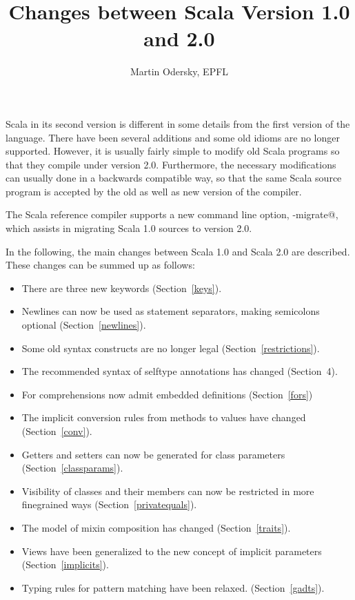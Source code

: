 \documentclass[a4paper,11pt,twoside]{article}
\title{Changes between Scala Version 1.0 and 2.0}
\author{Martin Odersky, EPFL}
\begin{document}
\sloppy
\maketitle

Scala in its second version is different in some details from the
first version of the language. There have been several additions and
some old idioms are no longer supported. However, it is usually fairly
simple to modify old Scala programs so that they compile under version
2.0. Furthermore, the necessary modifications can usually done in a
backwards compatible way, so that the same Scala source program is
accepted by the old as well as new version of the compiler.

The Scala reference compiler supports a new command line option,
\lstinline@-migrate@, which assists in migrating Scala 1.0
sources to version 2.0.

In the following, the main changes between Scala 1.0 and Scala 2.0 are
described. These changes can be summed up as follows:
\begin{itemize}
\item
There are three new keywords (Section~\ref{keys}).
\item
Newlines can now be used as statement separators, making semicolons
optional (Section~\ref{newlines}).
\item 
Some old syntax constructs are no longer legal (Section~\ref{restrictions}).
\item
The recommended syntax of selftype annotations has changed
(Section~4).
\item 
For comprehensions now admit embedded definitions (Section~\ref{fors})
\item
The implicit conversion rules from methods to values have changed
(Section~\ref{conv}).
\item
Getters and setters can now be generated for class parameters
(Section~\ref{classparams}).
\item
Visibility of classes and their members can now be restricted in more
finegrained ways (Section~\ref{privatequals}).
\item
The model of mixin composition has changed (Section~\ref{traits}).
\item
Views have been generalized to the new concept of implicit parameters
(Section~\ref{implicits}).
\item
Typing rules for pattern matching have been relaxed. (Section~\ref{gadts}).
\end{itemize}
\end{document}

